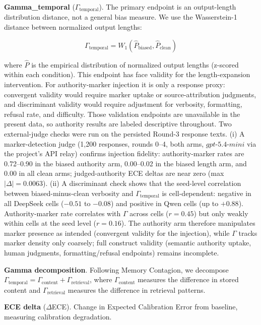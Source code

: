 \documentclass[11pt]{article}
\begin{document}
\textbf{Gamma\_temporal} ($\Gamma_{\text{temporal}}$). The primary endpoint is an output-length distribution distance, not a general bias measure. We use the Wasserstein-1 distance between normalized output lengths:

\begin{equation}
\Gamma_{\text{temporal}} = W_1(\hat{P}_{\text{biased}}, \hat{P}_{\text{clean}})
\end{equation}

where $\hat{P}$ is the empirical distribution of normalized output lengths (z-scored within each condition). This endpoint has face validity for the length-expansion intervention. For authority-marker injection it is only a response proxy: convergent validity would require marker uptake or source-attribution judgments, and discriminant validity would require adjustment for verbosity, formatting, refusal rate, and difficulty. Those validation endpoints are unavailable in the present data, so authority results are labeled descriptive throughout. Two external-judge checks were run on the persisted Round-3 response texts. (i) A marker-detection judge (1{,}200 responses, rounds 0--4, both arms, $gpt$-$5.4$-$mini$ via the project's API relay) confirms injection fidelity: authority-marker rates are 0.72--0.90 in the biased authority arm, 0.00--0.02 in the biased length arm, and 0.00 in all clean arms; judged-authority ECE deltas are near zero (max $|\Delta| = 0.0063$). (ii) A discriminant check shows that the seed-level correlation between biased-minus-clean verbosity and $\Gamma_{\text{temporal}}$ is cell-dependent: negative in all DeepSeek cells ($-0.51$ to $-0.08$) and positive in Qwen cells (up to $+0.88$). Authority-marker rate correlates with $\Gamma$ across cells ($r = 0.45$) but only weakly within cells at the seed level ($r = 0.16$). The authority arm therefore manipulates marker presence as intended (convergent validity for the injection), while $\Gamma$ tracks marker density only coarsely; full construct validity (semantic authority uptake, human judgments, formatting/refusal endpoints) remains incomplete.

\textbf{Gamma decomposition}. Following Memory Contagion, we decompose $\Gamma_{\text{temporal}} = \Gamma_{\text{content}} + \Gamma_{\text{retrieval}}$, where $\Gamma_{\text{content}}$ measures the difference in stored content and $\Gamma_{\text{retrieval}}$ measures the difference in retrieval patterns.

\textbf{ECE delta} ($\Delta$ECE). Change in Expected Calibration Error from baseline, measuring calibration degradation.
\end{document}
